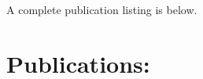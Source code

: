 









A complete publication listing is below.














%



%

%
%
%
%
%
%
%
%
%
%
%
%
%
%
%
%
%
%
%








\newpage
\nocite{*}
\section*{Publications: }
\begin{footnotesize}

%

\end{footnotesize}

%



